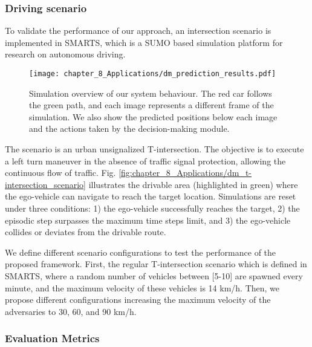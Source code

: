 \subsubsection{Driving scenario}
\label{subsubsec:8_decision_making_experimental_results_driving_scenario}

To validate the performance of our approach, an intersection scenario is implemented in SMARTS, which is a SUMO \cite{Sumo} based simulation platform for research on autonomous driving.

\begin{figure}[h]
	\centering        
	\texttt{[image: chapter\_8\_Applications/dm\_prediction\_results.pdf]}
	\captionsetup{justification=justified}
	\caption[Simulation overview of our system behaviour]{Simulation overview of our system behaviour. The red car follows the green path, and each image represents a different frame of the simulation. We also show the predicted positions below each image and the actions taken by the decision-making module.}
	\label{fig:chapter_8_Applications/dm_prediction_results}
\end{figure}

The scenario is an urban unsignalized T-intersection. The objective is to execute a left turn maneuver in the absence of traffic signal protection, allowing the continuous flow of traffic. Fig. \ref{fig:chapter_8_Applications/dm_t-intersection_scenario} illustrates the drivable area (highlighted in green) where the ego-vehicle can navigate to reach the target location. Simulations are reset under three conditions: 1) the ego-vehicle successfully reaches the target, 2) the episodic step surpasses the maximum time steps limit, and 3) the ego-vehicle collides or deviates from the drivable route.

We define different scenario configurations to test the performance of the proposed framework. First, the regular T-intersection scenario which is defined in SMARTS, where a random number of vehicles between [5-10] are spawned every minute, and the maximum velocity of these vehicles is 14 km/h. Then, we propose different configurations increasing the maximum velocity of the adversaries to 30, 60, and 90 km/h. 

\subsubsection{Evaluation Metrics}
\label{subsubsec:8_decision_making_experimental_results_evaluation_metrics}

